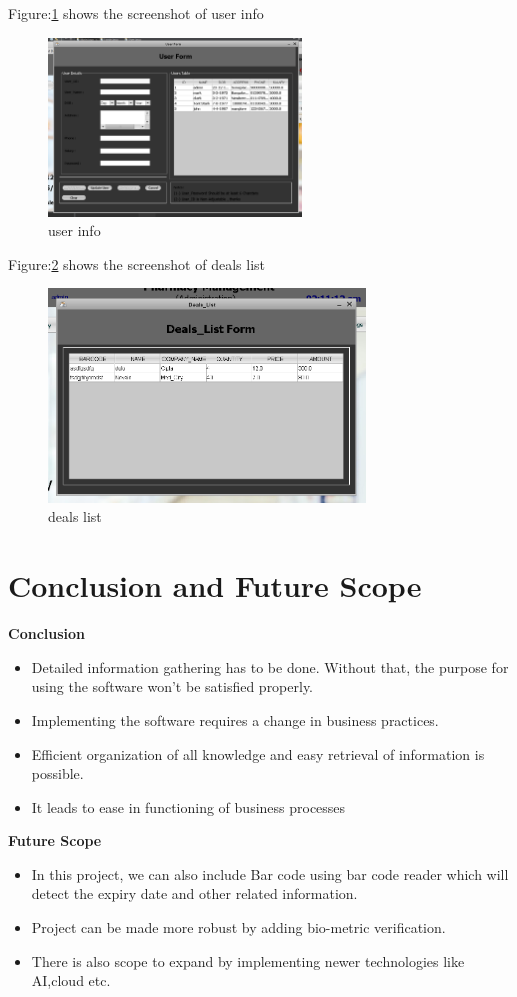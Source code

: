 \documentclass[12pt, letter paper]{report}
\begin{document}
Figure:\ref{fig:userinfo.png} shows the screenshot of user info
\begin{figure}[h]
	\centering
	\includegraphics[width=0.6\textwidth]{userinfo.png}
	\caption{user info}
	\label{fig:userinfo.png}
\end{figure}
\newpage
Figure:\ref{fig:dealslist.png} shows the screenshot of deals list
\begin{figure}[h]
	\centering
	\includegraphics[width=0.75\textwidth]{dealslist.png}
	\caption{deals list}
	\label{fig:dealslist.png}
\end{figure}

\chapter{Conclusion and Future Scope}

\textbf{Conclusion} 
\begin{itemize}
 \item {Detailed information gathering has to be done. Without that, the purpose for using the software won't be satisfied properly.}
 \item {Implementing the software requires a change in business practices.}
 \item{Efficient organization of all knowledge and easy retrieval of information is possible.}
 \item{It leads to ease in functioning of business processes}
\end{itemize}
\textbf{Future Scope} 
\begin{itemize}
 \item {In this project, we can also include Bar code using bar code reader which will detect the expiry date and other related information. }
 \item {Project can be made more robust by adding bio-metric verification. }
 \item{There is also scope to expand by implementing newer technologies like AI,cloud etc.}
\end{itemize}
\end{document}
